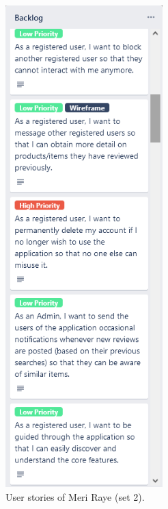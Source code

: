 \documentclass[11pt]{extarticle}
\begin{document}
\begin{center}
    \begin{figure}[H]
        \centering
        \includegraphics[width=2.4in]{Figures/user_stories_2.png}
        \caption{User stories of Meri Raye (set 2).}
    \end{figure}
\end{center}
\end{document}
